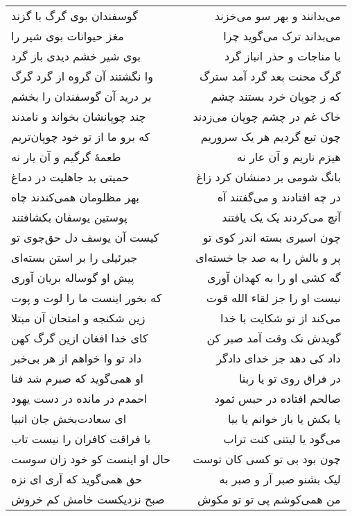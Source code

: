 \begin{center}
\begin{longtable}{l p{0.5cm} r}
گوسفندان بوی گرگ با گزند
&&
می‌بدانند و بهر سو می‌خزند
\\
مغز حیوانات بوی شیر را
&&
می‌بداند ترک می‌گوید چرا
\\
بوی شیر خشم دیدی باز گرد
&&
با مناجات و حذر انباز گرد
\\
وا نگشتند آن گروه از گرد گرگ
&&
گرگ محنت بعد گرد آمد سترگ
\\
بر درید آن گوسفندان را بخشم
&&
که ز چوپان خرد بستند چشم
\\
چند چوپانشان بخواند و نامدند
&&
خاک غم در چشم چوپان می‌زدند
\\
که برو ما از تو خود چوپان‌تریم
&&
چون تبع گردیم هر یک سروریم
\\
طعمهٔ گرگیم و آن یار نه
&&
هیزم ناریم و آن عار نه
\\
حمیتی بد جاهلیت در دماغ
&&
بانگ شومی بر دمنشان کرد زاغ
\\
بهر مظلومان همی‌کندند چاه
&&
در چه افتادند و می‌گفتند آه
\\
پوستین یوسفان بکشافتند
&&
آنچ می‌کردند یک یک یافتند
\\
کیست آن یوسف دل حق‌جوی تو
&&
چون اسیری بسته اندر کوی تو
\\
جبرئیلی را بر استن بسته‌ای
&&
پر و بالش را به صد جا خسته‌ای
\\
پیش او گوساله بریان آوری
&&
گه کشی او را به کهدان آوری
\\
که بخور اینست ما را لوت و پوت
&&
نیست او را جز لقاء الله قوت
\\
زین شکنجه و امتحان آن مبتلا
&&
می‌کند از تو شکایت با خدا
\\
کای خدا افغان ازین گرگ کهن
&&
گویدش نک وقت آمد صبر کن
\\
داد تو وا خواهم از هر بی‌خبر
&&
داد کی دهد جز خدای دادگر
\\
او همی‌گوید که صبرم شد فنا
&&
در فراق روی تو یا ربنا
\\
احمدم در مانده در دست یهود
&&
صالحم افتاده در حبس ثمود
\\
ای سعادت‌بخش جان انبیا
&&
یا بکش یا باز خوانم یا بیا
\\
با فراقت کافران را نیست تاب
&&
می‌گود یا لیتنی کنت تراب
\\
حال او اینست کو خود زان سوست
&&
چون بود بی تو کسی کان توست
\\
حق همی‌گوید که آری ای نزه
&&
لیک بشنو صبر آر و صبر به
\\
صبح نزدیکست خامش کم خروش
&&
من همی‌کوشم پی تو تو مکوش
\\
\end{longtable}
\end{center}
